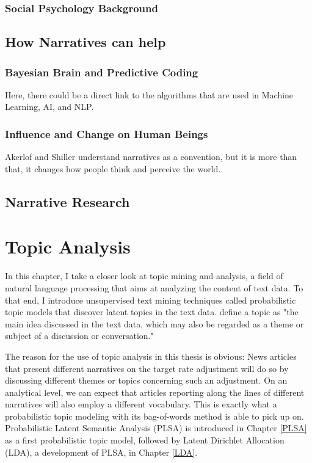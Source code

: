 \documentclass[11pt,a4paper,english,oneside]{book}
\numberwithin{equation}{chapter}
\begin{document}
\subsection{Social Psychology Background}


\section{How Narratives can help}

\subsection{Bayesian Brain and Predictive Coding}

Here, there could be a direct link to the algorithms that are used in Machine Learning, AI, and NLP. 

\subsection{Influence and Change on Human Beings}

Akerlof and Shiller understand narratives as a convention, but it is more than that, it changes how people think and perceive the world. \cite{Akerlof.2016}


\section{Narrative Research}



\chapter{Topic Analysis}\label{NLP}
In this chapter, I take a closer look at topic mining and analysis, a field of natural language processing that aims at analyzing the content of text data. To that end, I introduce unsupervised text mining techniques called probabilistic topic models that discover latent topics in the text data. \citet[p.~329]{Zhai.2016} define a topic as "the main idea discussed in the text data, which may also be regarded as a theme or subject of a discussion or conversation."

The reason for the use of topic analysis in this thesis is obvious: News articles that present different narratives on the target rate adjustment will do so by discussing different themes or topics concerning such an adjustment. On an analytical level, we can expect that articles reporting along the lines of different narratives will also employ a different vocabulary. This is exactly what a probabilistic topic modeling with its bag-of-words method is able to pick up on. Probabilistic Latent Semantic Analysis (PLSA) is introduced in Chapter \ref{PLSA} as a first probabilistic topic model, followed by Latent Dirichlet Allocation (LDA), a development of PLSA, in Chapter \ref{LDA}.
\end{document}
